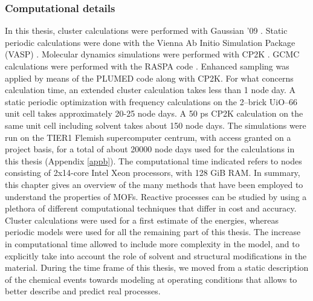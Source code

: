 \subsubsection*{Computational details}
In this thesis, cluster calculations were performed with Gaussian '09 \cite{frisch2015gaussian}. Static periodic calculations were done with the Vienna Ab Initio Simulation Package (VASP) \cite{kresse1996efficient, kresse1993ab, kresse1994ab, kresse1996efficiency, kresse1999ultrasoft}. Molecular dynamics simulations were performed with CP2K \cite{vandevondele2005quickstep}. GCMC calculations were performed with the RASPA code \cite{dubbeldam2016raspa}. Enhanced sampling was applied by means of the PLUMED code \cite{tribello2014plumed} along with CP2K. For what concerns calculation time, an extended cluster calculation takes less than 1 node day. A static periodic optimization with frequency calculations on the 2--brick UiO--66 unit cell takes approximately 20-25 node days. A 50 ps CP2K calculation on the same unit cell including solvent takes about 150 node days. The simulations were run on the TIER1 Flemish supercomputer centrum, with access granted on a project basis, for a total of about 20000 node days used for the calculations in this thesis (Appendix \ref{appb}). The computational time indicated refers to nodes consisting of 2x14-core Intel Xeon processors, with 128 GiB RAM.
\npar
\npar
\npar
\npar
In summary, this chapter gives an overview of the many methods that have been employed to understand the properties of MOFs. Reactive processes can be studied by using a plethora of different computational techniques that differ in cost and accuracy. Cluster calculations were used for a first estimate of the energies, whereas periodic models were used for all the remaining part of this thesis. The increase in computational time allowed to include more complexity in the model, and to explicitly take into account the role of solvent and structural modifications in the material. During the time frame of this thesis, we moved from a static description of the chemical events towards modeling at operating conditions that allows to better describe and predict real processes. 
\npar

\clearpage{\pagestyle{empty}\cleardoublepage}